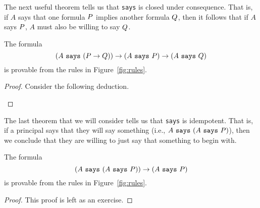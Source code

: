 \documentclass[11pt,twoside]{scrartcl}
\begin{document}
The next useful theorem tells us that \verb'says' is closed under consequence. That is, if $A$ says that one formula $P$ implies another formula $Q$, then it follows that if $A$ says $P$, $A$ must also be willing to say $Q$.

\begin{theorem}
The formula 
\[
(A~\texttt{\upshape says}~(P \rightarrow Q)) \rightarrow (A~\texttt{\upshape says}~P) \rightarrow (A~\texttt{\upshape says}~Q)
\] 
is provable from the rules in Figure~\ref{fig:rules}.
\end{theorem}
\begin{proof}
Consider the following deduction.
\begin{sequentdeduction}[array]
 {
}
\end{sequentdeduction}
\end{proof}

The last theorem that we will consider tells us that \verb'says' is idempotent. That is, if a principal says that they will say something (i.e., $A~\texttt{\upshape says}~(A~\texttt{\upshape says}~P)$), then we conclude that they are willing to just say that something to begin with.

\begin{theorem}
The formula
\[
(A~\texttt{\upshape says}~(A~\texttt{\upshape says}~P)) \rightarrow (A~\texttt{\upshape says}~P)
\]
is provable from the rules in Figure~\ref{fig:rules}.
\end{theorem}
\begin{proof}
This proof is left as an exercise.
\end{proof}



\end{document}
